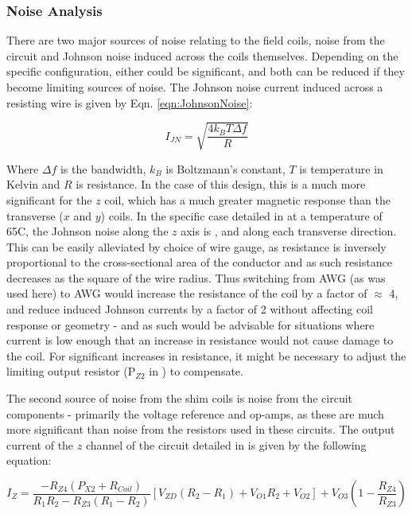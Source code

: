 \documentclass[PaulGanssle-Thesis.tex]{subfiles}
\begin{document}
\subsubsection{Noise Analysis}
\label{mag.design.shim.coils.circuit.noise}
There are two major sources of noise relating to the field coils, noise from the circuit and Johnson noise induced across the coils themselves. Depending on the specific configuration, either could be significant, and both can be reduced if they become limiting sources of noise. The Johnson noise current induced across a resisting wire is given by Eqn. \ref{eqn:JohnsonNoise}:

\begin{equation}
\label{eqn:JohnsonNoise}
I_{JN} = \sqrt{\frac{4k_BT\Delta f}{R}}
\end{equation}

Where $\Delta f$ is the bandwidth, $k_{B}$ is Boltzmann's constant, $T$ is temperature in Kelvin and $R$ is resistance. In the case of this design, this is a much more significant for the $z$ coil, which has a much greater magnetic response than the transverse ($x$ and $y$) coils. In the specific case detailed in  at a temperature of 65\degsym C, the Johnson noise along the $z$ axis is , and  along each transverse direction. This can be easily alleviated by choice of wire gauge, as resistance is inversely proportional to the cross-sectional area of the conductor and as such resistance decreases as the square of the wire radius. Thus switching from \unit[30]{AWG} (as was used here) to \unit[36]{AWG} would increase the resistance of the coil by a factor of $\approx$ 4, and reduce induced Johnson currents by a factor of 2 without affecting coil response or geometry - and as such would be advisable for situations where current is low enough that an increase in resistance would not cause damage to the coil. For significant increases in resistance, it might be necessary to adjust the limiting output resistor (P$_{Z2}$ in ) to compensate.

The second source of noise from the shim coils is noise from the circuit components - primarily the voltage reference and op-amps, as these are much more significant than noise from the resistors used in these circuits. The output current of the $z$ channel of the circuit detailed in  is given by the following equation:

\begin{equation}
I_{Z} = \frac{-R_{Z4}(P_{X2}+R_{Coil})}{R_{1}R_{2} - R_{Z3}(R_1-R_2)}\left[V_{ZD}(R_2 - R_1) + V_{O1}R_2 + V_{O2}\right] + V_{O3}\left(1-\frac{R_{Z4}}{R_{Z3}}\right) 
\end{equation}
\end{document}
